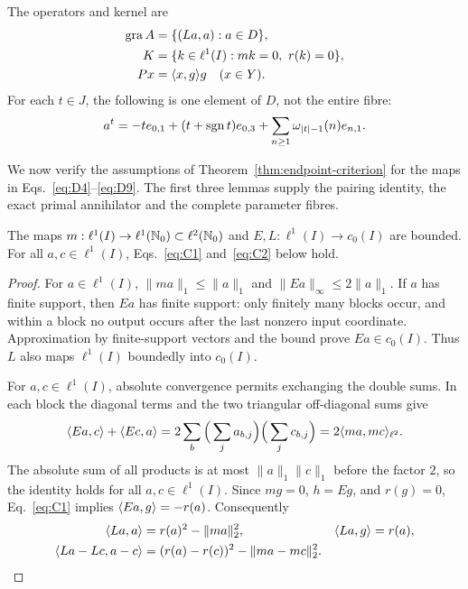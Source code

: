 \begin{definition}
The operators and kernel are
\begin{equation}
\begin{aligned}
\operatorname{gra} A&=\{(La,a):a\in D\},\\
K&=\{k\in\ell^1(I):mk=0,\ r(k)=0\},\\
Px&=\langle x,g\rangle g\quad(x\in Y).
\end{aligned}
\label{eq:D8}
\end{equation}
For each $t\in J$, the following is one element of $D$, not the entire fibre:
\begin{equation}
a^t=-t e_{0,1}+(t+\operatorname{sgn} t)e_{0,3}
       +\sum_{n\ge1}\omega_{|t|-1}(n)e_{n,1}.
\label{eq:D9}
\end{equation}
\end{definition}

\label{sec:supporting}
We now verify the assumptions of Theorem~\ref{thm:endpoint-criterion}
for the maps in Eqs.~\eqref{eq:D4}--\eqref{eq:D9}. The first three
lemmas supply the pairing identity, the exact primal annihilator and
the complete parameter fibres.

\begin{lemma}
\label{lem:coordinate-pairing}
The maps $m:\ell^1(I)\to\ell^1(\mathbb N_0)\subset\ell^2(\mathbb N_0)$ and
$E,L:\ell^1(I)\to c_0(I)$ are bounded. For all $a,c\in\ell^1(I)$,
Eqs.~\eqref{eq:C1} and~\eqref{eq:C2} below hold.
\end{lemma}
\begin{proof}
\label{sec:C1}
For $a\in\ell^1(I)$, $\|ma\|_1\le\|a\|_1$ and
$\|Ea\|_\infty\le2\|a\|_1$. If $a$ has finite support, then $Ea$ has
finite support: only finitely many blocks occur, and within a block no
output occurs after the last nonzero input coordinate. Approximation by
finite-support vectors and the bound prove $Ea\in c_0(I)$.
Thus $L$ also maps $\ell^1(I)$ boundedly into $c_0(I)$.

For $a,c\in\ell^1(I)$, absolute convergence permits exchanging the double
sums. In each block the diagonal terms and the two triangular
off-diagonal sums give
\begin{equation}
\langle Ea,c\rangle+\langle Ec,a\rangle
 =2\sum_b\Big(\sum_j a_{b,j}\Big)\Big(\sum_j c_{b,j}\Big)
 =2\langle ma,mc\rangle_{\ell^2}.
\label{eq:C1}
\end{equation}
The absolute sum of all products is at most $\|a\|_1\|c\|_1$ before the
factor $2$, so the identity holds for all $a,c\in\ell^1(I)$. Since $mg=0$, $h=Eg$,
and $r(g)=0$, Eq.~\eqref{eq:C1} implies $\langle Ea,g\rangle=-r(a)$.
Consequently
\begin{equation}
\begin{aligned}
\langle La,a\rangle&=r(a)^2-\|ma\|_2^2,&
\langle La,g\rangle&=r(a),\\
\langle La-Lc,a-c\rangle&=(r(a)-r(c))^2-\|ma-mc\|_2^2.
\end{aligned}
\label{eq:C2}
\end{equation}
\end{proof}

